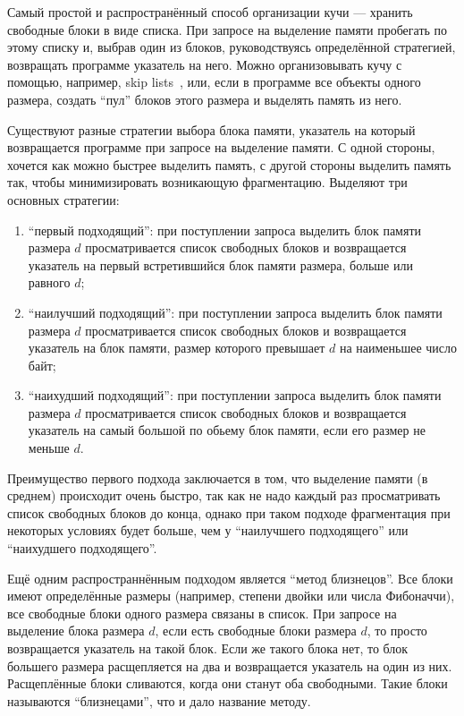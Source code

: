 Самый простой и распространённый способ организации кучи --- хранить свободные блоки в виде списка. При запросе на выделение памяти 
пробегать по этому списку и, выбрав один из блоков, руководствуясь определённой стратегией, возвращать программе указатель на него. 
Можно организовывать кучу с помощью, например, skip lists~\cite{skiplists}, или, если в программе все объекты одного размера, 
создать ``пул'' блоков этого размера и выделять память из него.

Существуют разные стратегии выбора блока памяти, указатель на который возвращается программе при запросе на выделение памяти. 
С одной стороны, хочется как можно быстрее выделить память, с другой стороны выделить память так, чтобы минимизировать возникающую фрагментацию. 
Выделяют три основных стратегии:

\begin{enumerate}
\item ``первый подходящий'': при поступлении запроса выделить блок памяти размера $d$ просматривается список свободных блоков и 
возвращается указатель на первый встретившийся блок памяти размера, больше или равного $d$;
\item ``наилучший подходящий'': при поступлении запроса выделить блок памяти размера $d$ просматривается список свободных блоков и 
возвращается указатель на блок памяти, размер которого превышает $d$ на наименьшее число байт;
\item ``наихудший подходящий'': при поступлении запроса выделить блок памяти размера $d$ просматривается список свободных блоков и 
возвращается указатель на самый большой по обьему блок памяти, если его размер не меньше $d$.
\end{enumerate}

Преимущество первого подхода заключается в том, что выделение памяти (в среднем)
происходит очень быстро, так как не надо каждый раз просматривать список свободных блоков до конца,
однако при таком подходе фрагментация при некоторых условиях будет больше, чем у 
``наилучшего подходящего'' или ``наихудшего подходящего''.

Ещё одним распространнённым подходом является ``метод близнецов''. Все блоки имеют 
определённые размеры (например, степени двойки или числа Фибоначчи), все свободные блоки
одного размера связаны в список. При запросе на выделение блока размера $d$, если есть свободные
блоки размера $d$, то просто возвращается указатель на такой блок. Если же такого блока нет, 
то блок большего размера расщепляется на два и возвращается указатель на один из них. 
Расщеплённые блоки сливаются, когда они станут оба свободными. Такие блоки называются
``близнецами'', что и дало название методу.

